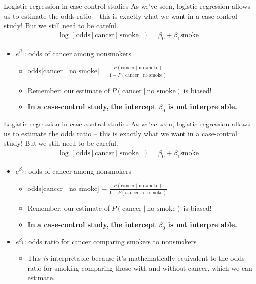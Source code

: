 \documentclass[10pt,t]{beamer}
\begin{document}
\begin{frame}{Logistic regression in case-control studies}
	As we've seen, logistic regression allows us to estimate the odds ratio -- this is exactly what we want in a case-control study! But we still need to be careful. \pause
	\begin{align*}
		\log(\text{odds}[\text{cancer} \mid \text{smoke}]) = \beta_0 + \beta_1 \text{smoke}
	\end{align*}\pause
	\begin{itemize}
		\item $e^{\beta_0}$: odds of cancer among nonsmokers\pause
		\begin{itemize}
			\item odds[cancer $\mid$ no smoke] = $\frac{P(\text{cancer} \mid \text{no smoke})}{1 - P(\text{cancer} \mid \text{no smoke})}$\pause
			\item Remember: our estimate of $P(\text{cancer} \mid \text{no smoke})$ is biased! \pause
			\item \textbf{In a case-control study, the intercept $\beta_0$ is not interpretable.} \pause
		\end{itemize}
	\end{itemize}
\end{frame}

\begin{frame}{Logistic regression in case-control studies}
	As we've seen, logistic regression allows us to estimate the odds ratio -- this is exactly what we want in a case-control study! But we still need to be careful. 
	\begin{align*}
		\log(\text{odds}[\text{cancer} \mid \text{smoke}]) = \beta_0 + \beta_1 \text{smoke}
	\end{align*}
	\begin{itemize}
		\item \sout{$e^{\beta_0}$: odds of cancer among nonsmokers}
		\begin{itemize}
			\item odds[cancer $\mid$ no smoke] = $\frac{P(\text{cancer} \mid \text{no smoke})}{1 - P(\text{cancer} \mid \text{no smoke})}$
			\item Remember: our estimate of $P(\text{cancer} \mid \text{no smoke})$ is biased! 
			\item \textbf{In a case-control study, the intercept $\beta_0$ is not interpretable.}
		\end{itemize}
	\item $e^{\beta_1}$: odds ratio for cancer comparing smokers to nonsmokers
	\begin{itemize}
		\item This \textit{is} interpretable because it's mathematically equivalent to the odds ratio for smoking comparing those with and without cancer, which we can estimate. 
	\end{itemize}
	\end{itemize}
\end{frame}
\end{document}
